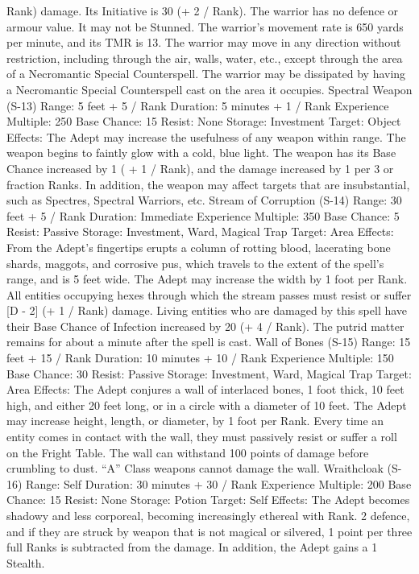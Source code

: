 \documentclass[a4paper]{article}
\begin{document}
\begin{multicols}{3}
Rank) damage. Its Initiative is 30 (+ 2 / Rank). The
warrior has no defence or armour value. It may not
be Stunned. The warrior’s movement rate is 650
yards per minute, and its TMR is 13. The warrior
may move in any direction without restriction,
including through the air, walls, water, etc., except
through the area of a Necromantic Special Counterspell. The warrior may be dissipated by having a
Necromantic Special Counterspell cast on the area
it occupies.
Spectral Weapon (S-13)
Range: 5 feet + 5 / Rank
Duration: 5 minutes + 1 / Rank
Experience Multiple: 250
Base Chance: 15%
Resist: None
Storage: Investment
Target: Object
Effects: The Adept may increase the usefulness
of any weapon within range. The weapon begins to
faintly glow with a cold, blue light. The weapon
has its Base Chance increased by 1 ( + 1 / Rank),
and the damage increased by 1 per 3 or fraction
Ranks. In addition, the weapon may affect targets
that are insubstantial, such as Spectres, Spectral
Warriors, etc.
Stream of Corruption (S-14)
Range: 30 feet + 5 / Rank
Duration: Immediate
Experience Multiple: 350
Base Chance: 5%
Resist: Passive
Storage: Investment, Ward, Magical Trap
Target: Area
Effects: From the Adept’s fingertips erupts a column of rotting blood, lacerating bone shards, maggots, and corrosive pus, which travels to the extent
of the spell’s range, and is 5 feet wide. The Adept
may increase the width by 1 foot per Rank. All
entities occupying hexes through which the stream
passes must resist or suffer [D - 2] (+ 1 / Rank)
damage. Living entities who are damaged by this
spell have their Base Chance of Infection increased
by 20 (+ 4 / Rank). The putrid matter remains for
about a minute after the spell is cast.
Wall of Bones (S-15)
Range: 15 feet + 15 / Rank
Duration: 10 minutes + 10 / Rank
Experience Multiple: 150
Base Chance: 30%
Resist: Passive
Storage: Investment, Ward, Magical Trap
Target: Area
Effects: The Adept conjures a wall of interlaced
bones, 1 foot thick, 10 feet high, and either 20 feet
long, or in a circle with a diameter of 10 feet. The
Adept may increase height, length, or diameter, by
1 foot per Rank. Every time an entity comes in
contact with the wall, they must passively resist or
suffer a roll on the Fright Table. The wall can
withstand 100 points of damage before crumbling
to dust. “A” Class weapons cannot damage the
wall.
Wraithcloak (S-16)
Range: Self
Duration: 30 minutes + 30 / Rank
Experience Multiple: 200
Base Chance: 15%
Resist: None
Storage: Potion
Target: Self
Effects: The Adept becomes shadowy and less
corporeal, becoming increasingly ethereal with
Rank. 2%
defence, and if they are struck by weapon that is
not magical or silvered, 1 point per three full Ranks
is subtracted from the damage. In addition, the
Adept gains a 1%
Stealth.


\end{multicols}
\end{document}
